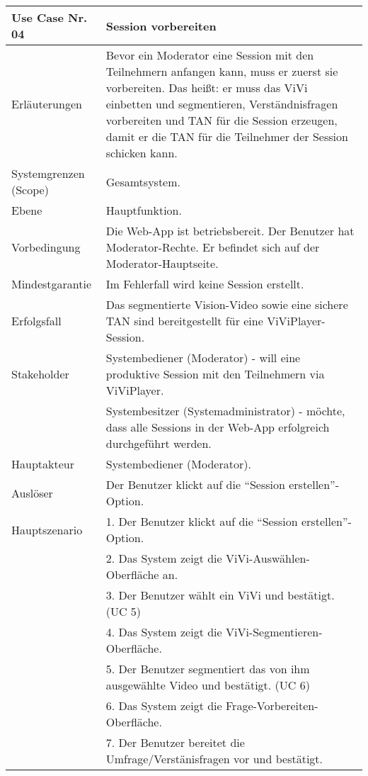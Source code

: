 \begin{tabularx}{\linewidth}{|l|X|}
	\hline
	Use Case Nr. 04			& \textbf{Session vorbereiten} \\ \hline
	Erläuterungen			& Bevor ein Moderator eine Session mit den Teilnehmern anfangen
	                          kann, muss er zuerst sie vorbereiten. Das heißt: er muss das ViVi einbetten und segmentieren, Verständnisfragen vorbereiten und TAN für die Session erzeugen, damit er die TAN für die Teilnehmer der Session schicken kann. \\ \hline
	Systemgrenzen (Scope)	& Gesamtsystem. \\ \hline
	Ebene					& Hauptfunktion. \\ \hline
	Vorbedingung			& Die Web-App ist betriebsbereit. Der Benutzer hat 
	                          Moderator-Rechte. Er befindet sich auf der Moderator-Hauptseite. \\ \hline
	Mindestgarantie			& Im Fehlerfall wird keine Session erstellt.\\ \hline
	Erfolgsfall  			& Das segmentierte Vision-Video sowie eine sichere TAN sind 
	                          bereitgestellt für eine ViViPlayer-Session. \\ \hline
	Stakeholder				& Systembediener (Moderator) - will eine produktive Session mit den 
	                          Teilnehmern via ViViPlayer. \\
							& Systembesitzer (Systemadministrator) - möchte, dass alle Sessions 
							  in der Web-App erfolgreich durchgeführt werden. \\ \hline
	Hauptakteur				& Systembediener (Moderator). \\ \hline
	Auslöser				& Der Benutzer klickt auf die ``Session erstellen''-Option. \\ \hline	
	Hauptszenario			& 1. Der Benutzer klickt auf die ``Session erstellen''-Option. \\ 
							& 2. Das System zeigt die ViVi-Auswählen-Oberfläche an. \\
							& 3. Der Benutzer wählt ein ViVi und bestätigt. (UC 5) \\ 
							& 4. Das System zeigt die ViVi-Segmentieren-Oberfläche. \\ 
							& 5. Der Benutzer segmentiert das von ihm ausgewählte Video und 
							  bestätigt. (UC 6) \\
							& 6. Das System zeigt die Frage-Vorbereiten-Oberfläche. \\
							& 7. Der Benutzer bereitet die Umfrage/Verstänisfragen vor und bestätigt.

\end{tabularx}
